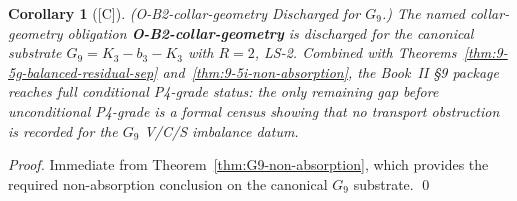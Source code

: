 \documentclass[12pt,oneside]{amsbook}
\theoremstyle{plain}
\newtheorem{corollary}[theorem]{Corollary}
\theoremstyle{definition}
\theoremstyle{remark}
\newcommand{\status}[1]{\textup{[#1]}}
\begin{document}
\begin{corollary}[\status{C}]\label{cor:O-B2-discharged}
\textup{(O-B2-collar-geometry Discharged for $G_9$.)}
The named collar-geometry obligation \textbf{O-B2-collar-geometry} is
discharged for the canonical substrate $G_9 = K_3 - b_3 - K_3$ with
$R=2$, LS-2.  Combined with Theorems~\ref{thm:9-5g-balanced-residual-sep}
and~\ref{thm:9-5i-non-absorption}, the Book~II §9 package reaches full
conditional P4-grade status: the only remaining gap before
unconditional P4-grade is a formal census showing that no transport
obstruction is recorded for the $G_9$ V/C/S imbalance datum.
\end{corollary}

\begin{proof}
Immediate from Theorem~\ref{thm:G9-non-absorption}, which provides
the required non-absorption conclusion on the canonical $G_9$
substrate. \qed
\end{proof}
\end{document}
